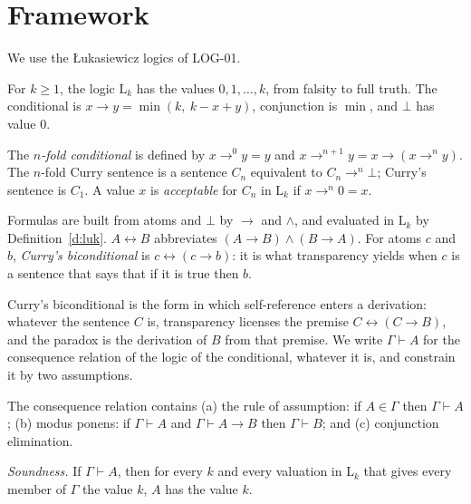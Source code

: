 \documentclass{situationist-preprint}
\begin{document}
\section{Framework}\label{s:frame}

We use the Łukasiewicz logics of LOG-01.

\begin{definition}\label{d:luk}
For $k \geq 1$, the logic $\mathrm{L}_k$ has the values $0, 1, \ldots, k$, from falsity to full truth. The conditional is $x \to y = \min(k,\ k - x + y)$, conjunction is $\min$, and $\bot$ has value $0$.
\end{definition}

\begin{definition}\label{d:iter}
The \emph{$n$-fold conditional} is defined by $x \to^0 y = y$ and $x \to^{n+1} y = x \to (x \to^n y)$. The $n$-fold Curry sentence is a sentence $C_n$ equivalent to $C_n \to^n \bot$; Curry's sentence is $C_1$. A value $x$ is \emph{acceptable} for $C_n$ in $\mathrm{L}_k$ if $x \to^n 0 = x$.
\end{definition}

\begin{definition}\label{d:form}
Formulas are built from atoms and $\bot$ by $\to$ and $\wedge$, and evaluated in $\mathrm{L}_k$ by Definition~\ref{d:luk}. $A \leftrightarrow B$ abbreviates $(A \to B) \wedge (B \to A)$. For atoms $c$ and $b$, \emph{Curry's biconditional} is $c \leftrightarrow (c \to b)$: it is what transparency yields when $c$ is a sentence that says that if it is true then $b$.
\end{definition}

Curry's biconditional is the form in which self-reference enters a derivation: whatever the sentence $C$ is, transparency licenses the premise $C \leftrightarrow (C \to B)$, and the paradox is the derivation of $B$ from that premise. We write $\Gamma \vdash A$ for the consequence relation of the logic of the conditional, whatever it is, and constrain it by two assumptions.

\begin{assumption}\label{a:rules}
The consequence relation contains (a) the rule of assumption: if $A \in \Gamma$ then $\Gamma \vdash A$; (b) modus ponens: if $\Gamma \vdash A$ and $\Gamma \vdash A \to B$ then $\Gamma \vdash B$; and (c) conjunction elimination.
\end{assumption}

\begin{assumption}\label{a:sound}
\emph{Soundness.} If $\Gamma \vdash A$, then for every $k$ and every valuation in $\mathrm{L}_k$ that gives every member of $\Gamma$ the value $k$, $A$ has the value $k$.
\end{assumption}
\end{document}
